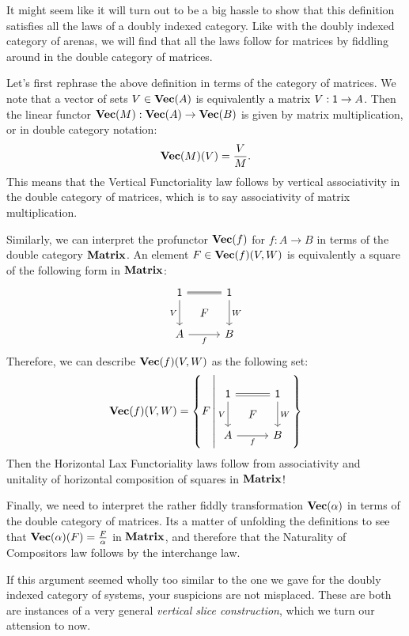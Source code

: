 \documentclass[DynamicalBook]{subfiles}
\begin{document}
It might seem like it will turn out to be a big hassle to show that this
definition satisfies all the laws of a doubly indexed category. Like with the
doubly indexed category of arenas, we will find that all the laws follow for
matrices by fiddling around in the double category of matrices.

Let's first rephrase the above definition in terms of the category of matrices.
We note that a vector of sets $V \in \textbf{Vec}(A)$ is equivalently a matrix $V :
\mathsf{1} \to A$. Then the linear functor $\textbf{Vec}(M) : \textbf{Vec}(A) \to
\textbf{Vec}(B)$ is given by matrix multiplication, or in double category notation:
$$\textbf{Vec}(M)(V) = \frac{V}{M}.$$
This means that the Vertical Functoriality law follows by vertical associativity
in the double category of matrices, which is to say associativity of matrix
multiplication.

Similarly, we can interpret the profunctor $\textbf{Vec}(f)$ for $f : A \to B$ in
terms of the double category $\textbf{Matrix}$. An element $F \in \textbf{Vec}(f)(V, W)$ is
equivalently a square of the following form in $\textbf{Matrix}$:
\[
        \begin{tikzcd}[sep=tiny]
          \ord{1} \ar[dd, "V"'] \ar[rr, equals] & & \ord{1} \ar[dd, "W"] \\
           & F & \\
          A \ar[rr, "f"'] & & B
        \end{tikzcd}
      \]
      Therefore, we can describe $\textbf{Vec}(f)(V, W)$ as the following set:
\[
\Cat{Vec}(f)(V, W) = \left\{ F \,\middle|
        \begin{tikzcd}[sep=tiny]
          \ord{1} \ar[dd, "V"'] \ar[rr, equals] & & \ord{1} \ar[dd, "W"] \\
           & F & \\
          A \ar[rr, "f"'] & & B
        \end{tikzcd}
  \right\}
\]
Then the Horizontal Lax Functoriality laws follow from associativity and unitality of
horizontal composition of squares in $\textbf{Matrix}$! 


Finally, we need to interpret the rather fiddly transformation
$\textbf{Vec}(\alpha)$ in terms of the double category of matrices. Its a matter of
unfolding the definitions to see that
$\textbf{Vec}(\alpha)(F) = \frac{F}{\alpha}$
in $\textbf{Matrix}$, and therefore that the Naturality of Compositors law follows
by the interchange law.

  If this argument seemed wholly too similar to the one we gave for the doubly
  indexed category of systems, your suspicions are not misplaced. These are both are instances of a very general \emph{vertical
    slice construction}, which we turn our attension to now.
\end{document}
